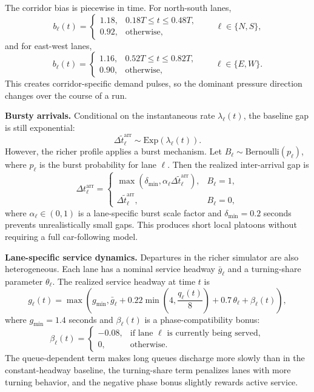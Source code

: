 \documentclass[11pt]{article}
\begin{document}
The corridor bias is piecewise in time. For north-south lanes,
\[
b_\ell(t) =
\begin{cases}
1.18, & 0.18T \le t \le 0.48T,\\
0.92, & \text{otherwise},
\end{cases}
\qquad \ell \in \{N,S\},
\]
and for east-west lanes,
\[
b_\ell(t) =
\begin{cases}
1.16, & 0.52T \le t \le 0.82T,\\
0.90, & \text{otherwise},
\end{cases}
\qquad \ell \in \{E,W\}.
\]
This creates corridor-specific demand pulses, so the dominant pressure direction changes over the course of a run.

\textbf{Bursty arrivals.}
Conditional on the instantaneous rate \(\lambda_\ell(t)\), the baseline gap is still exponential:
\[
\Delta \tilde{t}_{\ell}^{\mathrm{arr}} \sim \mathrm{Exp}(\lambda_\ell(t)).
\]
However, the richer profile applies a burst mechanism. Let \(B_\ell \sim \mathrm{Bernoulli}(p_\ell)\), where \(p_\ell\) is the burst probability for lane \(\ell\). Then the realized inter-arrival gap is
\[
\Delta t_{\ell}^{\mathrm{arr}} =
\begin{cases}
\max(\delta_{\min}, \alpha_\ell \Delta \tilde{t}_{\ell}^{\mathrm{arr}}), & B_\ell = 1,\\
\Delta \tilde{t}_{\ell}^{\mathrm{arr}}, & B_\ell = 0,
\end{cases}
\]
where \(\alpha_\ell \in (0,1)\) is a lane-specific burst scale factor and \(\delta_{\min}=0.2\) seconds prevents unrealistically small gaps. This produces short local platoons without requiring a full car-following model.

\textbf{Lane-specific service dynamics.}
Departures in the richer simulator are also heterogeneous. Each lane has a nominal service headway \(\bar{g}_\ell\) and a turning-share parameter \(\theta_\ell\). The realized service headway at time \(t\) is
\[
g_\ell(t) =
\max\!\left(
g_{\min},
\bar{g}_\ell
+ 0.22 \min\!\left(4, \frac{q_\ell(t)}{8}\right)
+ 0.7\,\theta_\ell
+ \beta_\ell(t)
\right),
\]
where \(g_{\min}=1.4\) seconds and \(\beta_\ell(t)\) is a phase-compatibility bonus:
\[
\beta_\ell(t) =
\begin{cases}
-0.08, & \text{if lane }\ell\text{ is currently being served},\\
0, & \text{otherwise}.
\end{cases}
\]
The queue-dependent term makes long queues discharge more slowly than in the constant-headway baseline, the turning-share term penalizes lanes with more turning behavior, and the negative phase bonus slightly rewards active service.
\end{document}

